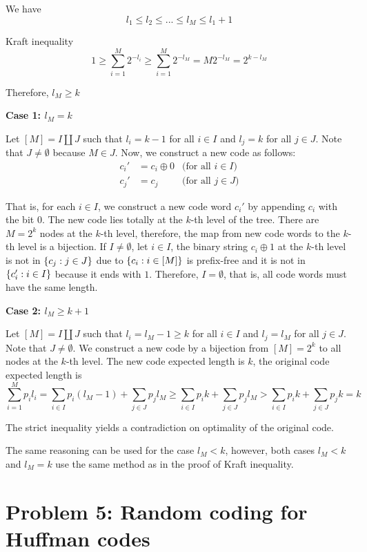 \documentclass{article}
\begin{document}
We have
$$
    l_1 \leq l_2 \leq ... \leq l_M \leq l_1 + 1
$$

Kraft inequality
$$
    1 \geq \sum_{i=1}^M 2^{-l_i} \geq \sum_{i=1}^M 2^{-l_M} = M 2^{-l_M} = 2^{k - l_M}
$$

Therefore, $l_M \geq k$

\textbf{Case 1: $l_M = k$}

Let $[M] = I \amalg J$ such that $l_i = k-1$ for all $i \in I$ and $l_j = k$ for all $j \in J$. Note that $J \neq \emptyset$ because $M \in J$. Now, we construct a new code as follows: 
\begin{align*}
    c_i' &= c_i \oplus 0 &\text{(for all $i \in I$)} \\
    c_j' &= c_j &\text{(for all $j \in J$)}
\end{align*}

That is, for each $i \in I$, we construct a new code word $c_i'$ by appending $c_i$ with the bit $0$. The new code lies totally at the $k$-th level of the tree. There are $M = 2^k$ nodes at the $k$-th level, therefore, the map from new code words to the $k$-th level is a bijection. If $I \neq \emptyset$, let $i \in I$, the binary string $c_i \oplus 1$ at the $k$-th level is not in $\{c_j: j \in J\}$ due to $\{c_i: i \in [M]\}$ is prefix-free and it is not in $\{c_i': i \in I\}$ because it ends with $1$. Therefore, $I = \emptyset$, that is, all code words must have the same length.

\textbf{Case 2: $l_M \geq k+1$}

Let $[M] = I \amalg J$ such that $l_i = l_M-1 \geq k$ for all $i \in I$ and $l_j = l_M$ for all $j \in J$. Note that $J \neq \emptyset$. We construct a new code by a bijection from $[M] = 2^k$ to all nodes at the $k$-th level. The new code expected length is $k$, the original code expected length is
$$
    \sum_{i=1}^M p_i l_i = \sum_{i \in I} p_i (l_M - 1) + \sum_{j \in J} p_j l_M \geq \sum_{i \in I} p_i k + \sum_{j \in J} p_j l_M > \sum_{i \in I} p_i k + \sum_{j \in J} p_j k = k
$$

The strict inequality yields a contradiction on optimality of the original code.

\begin{remark}
    The same reasoning can be used for the case $l_M < k$, however, both cases $l_M < k$ and $l_M = k$ use the same method as in the proof of Kraft inequality.
\end{remark}

\section{Problem 5: Random coding for Huffman codes}
\end{document}
